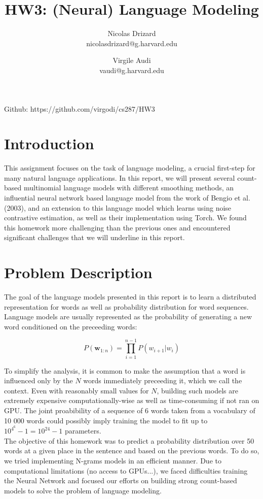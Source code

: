 \documentclass[11pt]{article}
\title{HW3: (Neural) Language Modeling}
\author{Nicolas Drizard \\ nicolasdrizard@g.harvard.edu \and Virgile Audi \\ vaudi@g.harvard.edu }
\begin{document}
\maketitle{}

\begin{center}
Github: https://github.com/virgodi/cs287/HW3
\end{center}
\section{Introduction}

This assignment focuses on the task of language modeling, a crucial first-step for many natural language applications. In this report, we will present several count-based multinomial language models with different smoothing methods, an influential neural network based language model from the work of Bengio et al. (2003), and an extension to this language model which learns using noise contrastive estimation, as well as their implementation using Torch. We found this homework more challenging than the previous ones and encountered significant challenges that we will underline in this report. 


\section{Problem Description}

The goal of the language models presented in this report is to learn a distributed representation for words as well as probability distribution for word sequences. Language models are usually represented as the probability of generating a new word conditioned on the preceeding words:

$$ P(\boldsymbol{w}_{1:n}) = \prod\limits_{i=1}^{n-1}P(w_{i+1}|w_i)$$

\noindent To simplify the analysis, it is common to make the assumption that a word is influenced only by the $N$ words immediately preceeding it, which we call the context. Even with reasonably small values for $N$, building such models are extremely expensive computationally-wise as well as time-consuming if not ran on GPU. The joint proabibility of a sequence of 6 words taken from a vocabulary of 10 000 words could possibly imply training the model to fit up to $10^{4^6}-1 =10^{24}-1$ parameters.\\

\noindent The objective of this homework was to predict a probability distribution over 50 words at a given place in the sentence and based on the previous words.
To do so, we tried implementing N-grams models in an efficient manner. Due to computational limitations (no access to GPUs...), we faced difficulties training the Neural Network and focused our efforts on building strong count-based models to solve the problem of language modeling.
\end{document}

